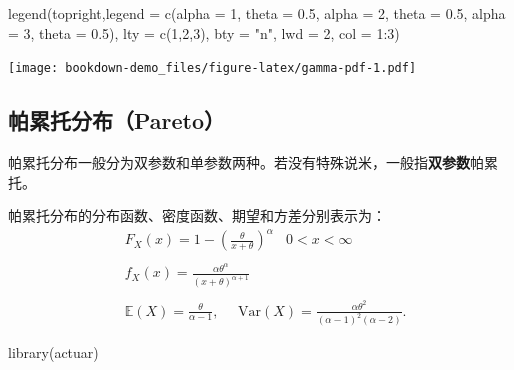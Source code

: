\documentclass[
]{book}
\newenvironment{Shaded}{\begin{snugshade}}{\end{snugshade}}
\newcommand{\AttributeTok}[1]{\textcolor[rgb]{0.77,0.63,0.00}{#1}}
\newcommand{\DecValTok}[1]{\textcolor[rgb]{0.00,0.00,0.81}{#1}}
\newcommand{\FunctionTok}[1]{\textcolor[rgb]{0.00,0.00,0.00}{#1}}
\newcommand{\NormalTok}[1]{#1}
\newcommand{\SpecialCharTok}[1]{\textcolor[rgb]{0.00,0.00,0.00}{#1}}
\newcommand{\StringTok}[1]{\textcolor[rgb]{0.31,0.60,0.02}{#1}}
\begin{document}
\begin{Shaded}
\begin{Highlighting}[]
\FunctionTok{legend}\NormalTok{(}\StringTok{\textquotesingle{}topright\textquotesingle{}}\NormalTok{,}\AttributeTok{legend =} \FunctionTok{c}\NormalTok{(}\StringTok{\textquotesingle{}alpha = 1, theta = 0.5\textquotesingle{}}\NormalTok{, }
                                     \StringTok{\textquotesingle{}alpha = 2, theta = 0.5\textquotesingle{}}\NormalTok{, }
                                     \StringTok{\textquotesingle{}alpha = 3, theta = 0.5\textquotesingle{}}\NormalTok{),}
       \AttributeTok{lty =} \FunctionTok{c}\NormalTok{(}\DecValTok{1}\NormalTok{,}\DecValTok{2}\NormalTok{,}\DecValTok{3}\NormalTok{), }\AttributeTok{bty =} \StringTok{"n"}\NormalTok{, }\AttributeTok{lwd =} \DecValTok{2}\NormalTok{,  }\AttributeTok{col =} \DecValTok{1}\SpecialCharTok{:}\DecValTok{3}\NormalTok{)}
\end{Highlighting}
\end{Shaded}

\texttt{[image: bookdown-demo\_files/figure-latex/gamma-pdf-1.pdf]}

\hypertarget{ux5e15ux7d2fux6258ux5206ux5e03pareto}{%
\subsection{帕累托分布（Pareto）}\label{ux5e15ux7d2fux6258ux5206ux5e03pareto}}

帕累托分布一般分为双参数和单参数两种。若没有特殊说米，一般指\textbf{双参数}帕累托。

帕累托分布的分布函数、密度函数、期望和方差分别表示为：
\[
\begin{align*}
  & {{F}_{X}}(x)=1-{{\left( \frac{\theta }{x+\theta } \right)}^{\alpha }}\ \ \ \ 0<x<\infty  \\ 
 &  \\ 
 & {{f}_{X}}(x)=\frac{\alpha {{\theta }^{\alpha }}}{{{(x+\theta )}^{\alpha +1}}} \\ 
 &  \\ 
 & \mathbb{E}(X)=\frac{\theta }{\alpha -1},\ \ \ \ \ \ \text{Var}(X)=\frac{\alpha {{\theta }^{2}}}{{{(\alpha -1)}^{2}}(\alpha -2)}.
\end{align*}
\]

\begin{Shaded}
\begin{Highlighting}[]
\FunctionTok{library}\NormalTok{(actuar)}
\end{Highlighting}
\end{Shaded}
\end{document}
